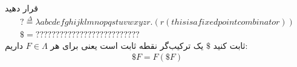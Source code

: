 قرار دهید
\begin{gather*}
    ? \overset{\Delta}{=} \lambda abcdefghijklmnopqstuvwxyzr. (r (thisisafixedpointcombinator)) \\
    \$ = ??????????????????????????
\end{gather*}
ثابت کنید $\$$ یک ترکیب‌گر نقطه ثابت است یعنی برای هر $F \in \Lambda$ داریم:
\begin{gather*}
    \$ F = F(\$ F)
\end{gather*}